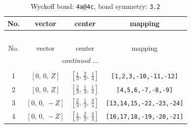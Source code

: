 \documentclass[fleqn,8pt]{jsarticle}
\begin{document}
\renewcommand{\arraystretch}{1.2}
\begin{longtable}{cccc}
\caption{Wyckoff bond: {\tt 4a@4c}, bond symmetry: {\tt 3.2}}
 \\
 \hline \hline
No. & vector & center & mapping \\ \hline \endfirsthead

\multicolumn{3}{l}{\tablename\ \thetable{}} \\
 \hline \hline
No. & vector & center & mapping \\ \hline \endhead

 \hline \hline
\multicolumn{3}{r}{\footnotesize\it continued ...} \\ \endfoot

 \hline \hline
\multicolumn{3}{r}{} \\ \endlastfoot

1 & $\left[ 0,\, 0,\, Z \right]$ & $\left[ \frac{1}{3},\, \frac{2}{3},\, \frac{1}{4} \right]$ & {\tt [1,2,3,-10,-11,-12]} \\ \hline
2 & $\left[ 0,\, 0,\, Z \right]$ & $\left[ \frac{2}{3},\, \frac{1}{3},\, \frac{1}{4} \right]$ & {\tt [4,5,6,-7,-8,-9]} \\ \hline
3 & $\left[ 0,\, 0,\, - Z \right]$ & $\left[ \frac{2}{3},\, \frac{1}{3},\, \frac{3}{4} \right]$ & {\tt [13,14,15,-22,-23,-24]} \\ \hline
4 & $\left[ 0,\, 0,\, - Z \right]$ & $\left[ \frac{1}{3},\, \frac{2}{3},\, \frac{3}{4} \right]$ & {\tt [16,17,18,-19,-20,-21]} \\
\end{longtable}
\renewcommand{\arraystretch}{1.2}
\end{document}
